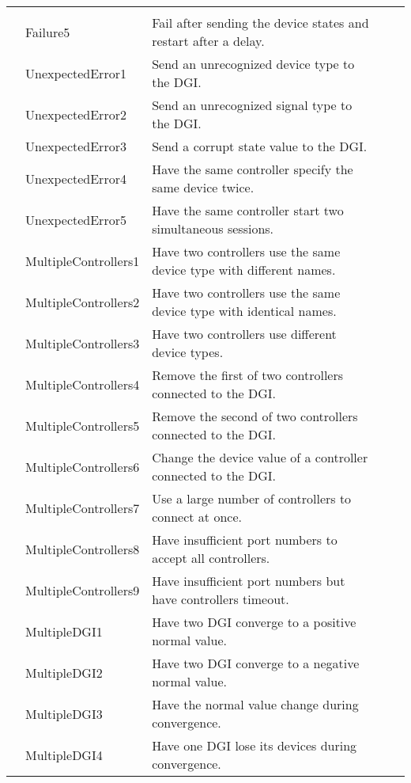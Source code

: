 \documentclass{article}
\newcounter{rownum}
\newcommand\rownumber{\stepcounter{rownum}\arabic{rownum}}
\begin{document}
\begin{longtable}{|c|p{4cm}|p{5cm}|c|p{6cm}|}
 						 & & \\
 	\rownumber & Failure5 & Fail after sending the device states and restart after a delay.
 						 & & \\
 	\rownumber & UnexpectedError1 & Send an unrecognized device type to the DGI.
 						 & & \\
 	\rownumber & UnexpectedError2 & Send an unrecognized signal type to the DGI.
 						 & & \\
 	\rownumber & UnexpectedError3 & Send a corrupt state value to the DGI.
 						 & & \\
 	\rownumber & UnexpectedError4 & Have the same controller specify the same device twice.
 						 & & \\
 	\rownumber & UnexpectedError5 & Have the same controller start two simultaneous sessions.
 						 & & \\
 	\rownumber & MultipleControllers1 & Have two controllers use the same device type with different names.
 						 & & \\
 	\rownumber & MultipleControllers2 & Have two controllers use the same device type with identical names.
 						 & & \\
 	\rownumber & MultipleControllers3 & Have two controllers use different device types.
 						 & & \\
 	\rownumber & MultipleControllers4 & Remove the first of two controllers connected to the DGI.
 						 & & \\
 	\rownumber & MultipleControllers5 & Remove the second of two controllers connected to the DGI.
 						 & & \\
 	\rownumber & MultipleControllers6 & Change the device value of a controller connected to the DGI.
 						 & & \\
 	\rownumber & MultipleControllers7 & Use a large number of controllers to connect at once.
 						 & & \\
 	\rownumber & MultipleControllers8 & Have insufficient port numbers to accept all controllers.
 						 & & \\
 	\rownumber & MultipleControllers9 & Have insufficient port numbers but have controllers timeout.
 						 & & \\
 	\rownumber & MultipleDGI1 & Have two DGI converge to a positive normal value.
 						 & & \\
 	\rownumber & MultipleDGI2 & Have two DGI converge to a negative normal value.
 						 & & \\
 	\rownumber & MultipleDGI3 & Have the normal value change during convergence.
 						 & & \\
 	\rownumber & MultipleDGI4 & Have one DGI lose its devices during convergence.
 						 & & \\
\end{longtable}
\end{document}
